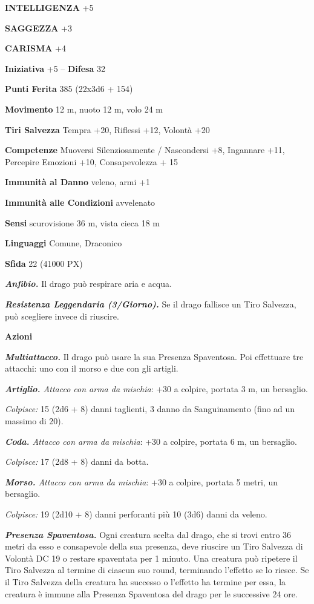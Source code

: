 \begin{multicols}{2}
\textbf{INTELLIGENZA} +5

\textbf{SAGGEZZA} +3

\textbf{CARISMA} +4

\textbf{Iniziativa} +5 -- \textbf{Difesa} 32

\textbf{Punti Ferita} 385 (22x3d6 + 154)

\textbf{Movimento} 12 m, nuoto 12 m, volo 24 m

\textbf{Tiri Salvezza} Tempra +20, Riflessi +12, Volontà +20

\textbf{Competenze} Muoversi Silenziosamente / Nascondersi +8, Ingannare +11, Percepire Emozioni +10, Consapevolezza + 15

\textbf{Immunità al Danno} veleno, armi +1

\textbf{Immunità alle Condizioni}
avvelenato

\textbf{Sensi} scurovisione 36 m, vista cieca 18 m

\textbf{Linguaggi} Comune, Draconico

\textbf{Sfida} 22 (41000 PX)

\textit{\textbf{Anfibio.}} Il drago può respirare aria e acqua.

\textit{\textbf{Resistenza Leggendaria (3/Giorno).}} Se il drago fallisce un Tiro Salvezza, può scegliere invece di riuscire.

\textbf{Azioni}

\textit{\textbf{Multiattacco.}} Il drago può usare la sua Presenza Spaventosa. Poi effettuare tre attacchi: uno con il morso e due con gli artigli.

\textit{\textbf{Artiglio.} Attacco con arma da mischia}: +30 a colpire, portata 3 m, un bersaglio.

\textit{Colpisce:} 15 (2d6 + 8) danni taglienti, 3 danno da Sanguinamento (fino ad un massimo di 20).

\textit{\textbf{Coda.} Attacco con arma da mischia}: +30 a colpire, portata 6 m, un bersaglio.

\textit{Colpisce:} 17 (2d8 + 8) danni da botta.

\textit{\textbf{Morso.} Attacco con arma da mischia}: +30 a colpire, portata 5 metri, un bersaglio.

\textit{Colpisce:} 19 (2d10 + 8) danni perforanti più 10 (3d6) danni da veleno.

\textit{\textbf{Presenza Spaventosa.}} Ogni creatura scelta dal drago, che si trovi entro 36 metri da esso e consapevole della sua presenza, deve riuscire un Tiro Salvezza di Volontà DC 19 o restare spaventata per 1 minuto. Una creatura può ripetere il Tiro Salvezza al termine di ciascun suo round, terminando l'effetto se lo riesce. Se il Tiro Salvezza della creatura ha successo o l'effetto ha termine per essa, la creatura è immune alla Presenza Spaventosa del drago per le successive 24 ore.


\end{multicols}
